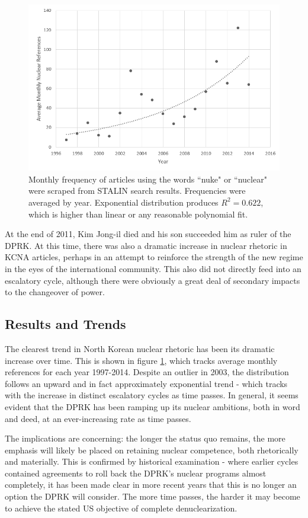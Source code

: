 \begin{figure}
\centering
	\includegraphics[width=0.7\linewidth]{../kcna_refs}
	\caption{Monthly frequency of articles using the words ``nuke" or ``nuclear" were scraped from STALIN search results. Frequencies were averaged by year. Exponential distribution produces $R^2=0.622$, which is higher than linear or any reasonable polynomial fit.}
\label{fig:kcna_refs}
\end{figure}


At the end of 2011, Kim Jong-il died and his son succeeded him as ruler of the DPRK. At this time, there was also a dramatic increase in nuclear rhetoric in KCNA articles, perhaps in an attempt to reinforce the strength of the new regime in the eyes of the international community\cite{rich14}. This also did not directly feed into an escalatory cycle, although there were obviously a great deal of secondary impacts to the changeover of power.

\subsection{Results and Trends}

The clearest trend in North Korean nuclear rhetoric has been its dramatic increase over time. This is shown in figure \ref{fig:kcna_refs}, which tracks average monthly references for each year 1997-2014. Despite an outlier in 2003, the distribution follows an upward and in fact approximately exponential trend - which tracks with the increase in distinct escalatory cycles as time passes. In general, it seems evident that the DPRK has been ramping up its nuclear ambitions, both in word and deed, at an ever-increasing rate as time passes.

The implications are concerning: the longer the status quo remains, the more emphasis will likely be placed on retaining nuclear competence, both rhetorically and materially. This is confirmed by historical examination - where earlier cycles contained agreements to roll back the DPRK's nuclear programs almost completely, it has been made clear in more recent years that this is no longer an option the DPRK will consider. The more time passes, the harder it may become to achieve the stated US objective of complete denuclearization.

